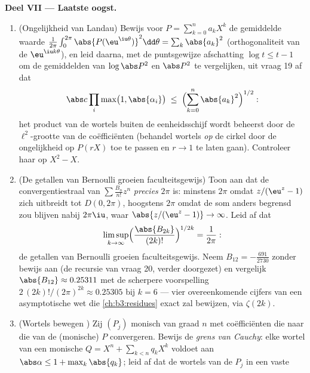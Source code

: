 \begin{problem}
\medskip
\noindent\textbf{Deel VII --- Laatste oogst.}
\begin{enumerate}[resume]
  \item (Ongelijkheid van Landau) Bewijs voor $P =
        \sum_{k=0}^na_kX^k$ de gemiddelde waarde
        $\frac1{2\pi}\int_0^{2\pi}
        \abs{P(\eu^{\iu\theta})}^2\dd\theta =
        \sum_k\abs{a_k}^2$ (orthogonaliteit van de $\eu^{\iu
        k\theta}$), en leid daarna, met de puntsgewijze
        afschatting $\log t \leq t - 1$ om de gemiddelden van
        $\log\abs P^2$ en $\abs P^2$ te vergelijken, uit vraag 19
        af dat
        \[
        \abs c\prod_{i}\max\bigl(1, \abs{\alpha_i}\bigr)
        \;\leq\;
        \Bigl(\sum_{k=0}^{n}\abs{a_k}^2\Bigr)^{1/2} :
        \]
        het product van de wortels buiten de eenheidsschijf wordt
        beheerst door de $\ell^2$-grootte van de coëfficiënten
        (behandel wortels \emph{op} de cirkel door de
        ongelijkheid op $P(rX)$ toe te passen en $r \to 1$ te
        laten gaan). Controleer haar op $X^2 - X$.
  \item (De getallen van Bernoulli groeien faculteitsgewijs) Toon
        aan dat de convergentiestraal van $\sum\frac{B_n}{n!}z^n$
        \emph{precies} $2\pi$ is: minstens $2\pi$ omdat $z/(\eu^z
        - 1)$ zich  uitbreidt tot $D(0, 2\pi)$, hoogstens
        $2\pi$ omdat de som anders begrensd zou blijven nabij
        $2\pi\iu$, waar $\abs{z/(\eu^z-1)} \to \infty$. Leid af
        dat
        \[
        \limsup_{k\to\infty}
        \Bigl(\frac{\abs{B_{2k}}}{(2k)!}\Bigr)^{1/2k}
        = \frac1{2\pi} :
        \]
        de getallen van Bernoulli groeien faculteitsgewijs. Neem
        $B_{12} = -\frac{691}{2730}$ zonder bewijs aan (de
        recursie van vraag 20, verder doorgezet) en vergelijk
        $\abs{B_{12}} \approx 0.25311$ met de scherpere
        voorspelling $2\,(2k)!/(2\pi)^{2k} \approx 0.25305$ bij
        $k = 6$ --- vier overeenkomende cijfers van een
        asymptotische wet die \cref{ch:b3:residues} exact zal
        bewijzen, via $\zeta(2k)$.
  \item (Wortels bewegen ) Zij $(P_j)$ monisch van graad
        $n$ met coëfficiënten die naar die van de (monische) $P$
        convergeren. Bewijs de \emph{grens van Cauchy}: elke
        wortel van een monische $Q = X^n + \sum_{k<n}q_kX^k$
        voldoet aan $\abs\alpha \leq 1 + \max_k\abs{q_k}$; leid
        af dat de wortels van de $P_j$ in een vaste 

\end{enumerate}
\end{problem}
